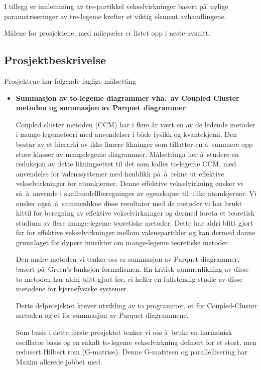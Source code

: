 I tillegg er innlemming av tre-partikkel vekselvirkninger basert
p\aa\ nylige parametriseringer av tre-legeme krefter et viktig
element avhandlingene.

M\aa lene for prosjektene, med milep\ae ler er listet opp
i neste avsnitt.

\subsection*{Prosjektbeskrivelse}

Prosjektene har f\o lgende faglige m\aa lsetting

\begin{itemize}

\item {\bf Summasjon av to-legeme diagrammer vha.\ av 
            Coupled Cluster metoden og summasjon av Parquet diagrammer}

Coupled cluster metoden (CCM) har i flere \aa r v\ae rt
en av de ledende metoder i mange-legemeteori med anvendelser 
i b\aa de fysikk 
og kvantekjemi. Den best\aa r av et hierarki av ikke-lin\ae re
likninger som tillatter en \aa\ summere opp
store klasser av mangelegeme diagrammer. 
M\aa lsettinga her \aa\ studere en reduksjon av dette
likningsettet til det som kalles to-legeme CCM, med
anvendelse for valenssystemer med henblikk p\aa\
\aa\ rekne ut effektive vekselvirkninger for 
atomkjerner. Denne effektive vekselvirkning \o nsker vi 
s\aa\ \aa\ anvende i skallmodellberegninger av egenskaper
til ulike atomkjerner.
Vi \o nsker ogs\aa\ \aa\ sammenlikne disse resultater
med de metoder vi har brukt hittil for beregning
av effektive vekselvirkninger og dermed foreta et teoretisk
studium av flere mange-legeme teoretiske metoder. Dette har aldri
blitt gjort f\o r for effektive vekselvirkninger mellom
valenspartikler og kan dermed danne grunnlaget 
for dypere innsikter om mange-legeme teoretiske metoder. 

Den andre metoden vi tenker oss er summasjon av Parquet diagrammer,
basert p\aa\ Green's funksjon formalismen. En kritisk sammenlikning
av disse to metoden har aldri blitt gjort f\o r, ei  heller en fullstendig
studie av disse metodene for kjernefysiske systemer.

Dette delprosjektet krever utvikling av to programmer, et for Coupled-Cluster
metoden og et for summasjon av Parquet diagrammene.

Som basis i dette f\o rste prosjektet tenker vi oss \aa\ bruke en
harmonisk oscillator basis og en s\aa kalt to-legeme vekselvirkning
definert for et stort, men redusert Hilbert rom (G-matrise). Denne 
G-matrisen og parallellisering har Maxim allerede jobbet med.


\end{itemize}

